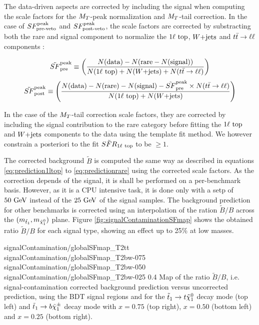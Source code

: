        The data-driven aspects are corrected by including the signal when computing the scale factors for the
        $M_T$-peak normalization and $M_T$-tail correction. In the case of $SF_{\text{pre-veto}}^{\text{peak}}$ and $SF_{\text{post-veto}}^{\text{peak}}$, the scale factors
        are corrected by substracting both the rare and signal component to normalize the $1\ell~\text{top}$, $\text{$W$+jets}$
        and $t\bar{t} \rightarrow \ell \ell$ components :

        \begin{equation}
            \tilde{SF}_{\text{pre}}^{\text{peak}} \equiv \left( \frac{N(\text{data}) - N(\text{rare} - N(\text{signal}))}{N(1\ell~\text{top}) + N(\text{$W$+jets}) + N(t\bar{t} \rightarrow \ell \ell)} \right)
        \end{equation}
        \begin{equation}
            \tilde{SF}_{\text{post}}^{\text{peak}} \equiv \left( \frac{N(\text{data}) - N(\text{rare}) - N(\text{signal}) - \tilde{SF}_{\text{pre}}^{\text{peak}} \times N(t\bar{t} \rightarrow \ell \ell)}{N(1\ell~\text{top}) + N(\text{$W$+jets})} \right)
        \end{equation}

        In the case of the $M_T$-tail correction scale factors, they are corrected by including the signal contribution
        to the rare category before fitting the $1\ell~\text{top}$ and $\text{$W$+jets}$ components to the data using the template
        fit method. We however constrain a posteriori to the fit $\tilde{SFR}_{1\ell~\text{top}}$ to be $\geq 1$.

        The corrected background $\tilde{B}$ is computed the same way as described in equations \ref{eq:prediction1ltop} to \ref{eq:predictionrare}
        using the corrected scale factors. As the correction depends of the signal, it is shall be performed on a per-benchmark
        basis. However, as it is a CPU intensive task, it is done only with a setp of $50 ~\text{GeV}$ instead of the $25 ~\text{GeV}$
        of the signal samples. The background prediction for other benchmarks is corrected using an interpolation of
        the ration $\tilde{B}/B$ across the $(m_{\tilde{t}_1},m_{\tilde{\chi}_1^0})$ plane. Figure \ref{fig:signalContaminationSFmap} shows
        the obtained ratio $\tilde{B}/B$ for each signal type, showing an effect up to 25\% at low masses.

                          {signalContamination/globalSFmap_T2tt}
                          {signalContamination/globalSFmap_T2bw-075}
                          {signalContamination/globalSFmap_T2bw-050}
                          {signalContamination/globalSFmap_T2bw-025}
                          {0.4}
                          {Map of the ratio $\tilde{B}/B$, i.e. signal-contamination corrected background prediction versus uncorrected prediction, using the BDT signal regions and for the $\tilde{t}_1 \rightarrow t \tilde{\chi}_1^0$ decay mode (top left) and $\tilde{t}_1 \rightarrow b \tilde{\chi}_1^\pm$ decay mode with $x=0.75$ (top right), $x=0.50$ (bottom left) and $x=0.25$ (bottom right).}

